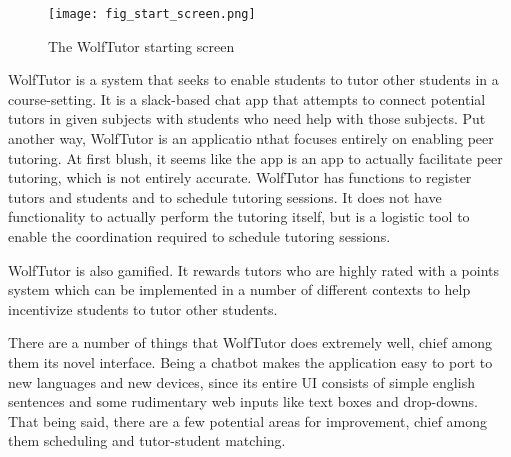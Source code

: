 \begin{figure}[ht]
  \caption{The WolfTutor starting screen} 
  \centering
    \label{fig:start_screen}
    \texttt{[image: fig\_start\_screen.png]}
\end{figure}

WolfTutor is a system that seeks to enable students to tutor other students in a
course-setting. It is a slack-based chat app that attempts to connect potential
tutors in given subjects with students who need help with those subjects. Put
another way, WolfTutor is an applicatio nthat focuses entirely on enabling 
peer tutoring. At first blush, it seems like the app is an app to actually
facilitate peer tutoring, which is not entirely accurate. WolfTutor has
functions to register tutors and students and to schedule tutoring sessions. It
does not have functionality to actually perform the tutoring itself, but is a
logistic tool to enable the coordination required to schedule tutoring sessions.

WolfTutor is also gamified. It rewards tutors who are highly rated with a points
system which can be implemented in a number of different contexts to help
incentivize students to tutor other students.

There are a number of things that WolfTutor does extremely well, chief among
them its novel interface.  Being a chatbot makes the application easy to port to
new languages and new devices, since its entire UI consists of simple english
sentences and some rudimentary web inputs like text boxes and drop-downs.  That
being said, there are a few potential areas for improvement, chief among them
scheduling and tutor-student matching. 

